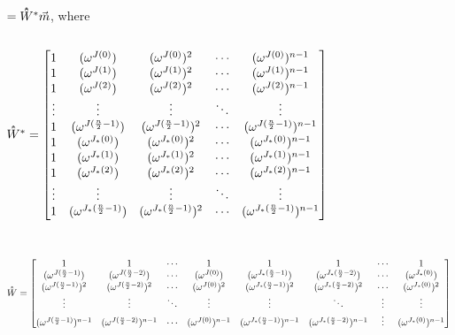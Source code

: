 $ $

$ = \hathat{W}^* \vec{m} $, where 

$ $

\noindent $\hathat{W}^* = \begin{bmatrix}
1 & (\omega^{J(0)}) & (\omega^{J(0)})^2 & \cdots & (\omega^{J(0)})^{n-1}\\
1 & (\omega^{J(1)}) & (\omega^{J(1)})^2 & \cdots & (\omega^{J(1)})^{n-1}\\
1 & (\omega^{J(2)}) & (\omega^{J(2)})^2 & \cdots & (\omega^{J(2)})^{n-1}\\
\vdots & \vdots & \vdots & \ddots & \vdots \\
1 & (\omega^{J(\frac{n}{2}-1)}) & (\omega^{J(\frac{n}{2}-1)})^2 & \cdots & (\omega^{J(\frac{n}{2}-1)})^{n-1}\\
1 & (\omega^{J_*(0)}) & (\omega^{J_*(0)})^2 & \cdots & (\omega^{J_*(0)})^{n-1}\\
1 & (\omega^{J_*(1)}) & (\omega^{J_*(1)})^2 & \cdots & (\omega^{J_*(1)})^{n-1}\\
1 & (\omega^{J_*(2)}) & (\omega^{J_*(2)})^2 & \cdots & (\omega^{J_*(2)})^{n-1}\\
\vdots & \vdots & \vdots & \ddots & \vdots \\
1 & (\omega^{J_*(\frac{n}{2}-1)}) & (\omega^{J_*(\frac{n}{2}-1)})^2 & \cdots & (\omega^{J_*(\frac{n}{2}-1)})^{n-1}\\
\end{bmatrix}$

$ $

$ $

\noindent $\hathat W = \begin{bmatrix}
1 & 1 & \cdots & 1 & 1 & 1 & \cdots & 1\\
(\omega^{J(\frac{n}{2} - 1)}) & (\omega^{J(\frac{n}{2} - 2)}) & \cdots & (\omega^{J(0)}) & (\omega^{J_*(\frac{n}{2} - 1)}) & (\omega^{J_*(\frac{n}{2} - 2)}) & \cdots & (\omega^{J_*(0)})\\
(\omega^{J(\frac{n}{2} - 1)})^2 & (\omega^{J(\frac{n}{2} - 2)})^2 & \cdots & (\omega^{J(0)})^2 & (\omega^{J_*(\frac{n}{2} - 1)})^2 & (\omega^{J_*(\frac{n}{2} - 2)})^2 & \cdots & (\omega^{J_*(0)})^2 \\
\vdots & \vdots & \ddots & \vdots & \vdots & \ddots & \vdots & \vdots \\
(\omega^{J(\frac{n}{2} - 1)})^{n-1} & (\omega^{J(\frac{n}{2} - 2)})^{n-1} & \cdots & (\omega^{J(0)})^{n-1} & (\omega^{J_*(\frac{n}{2} - 1)})^{n-1} & (\omega^{J_*(\frac{n}{2} - 2)})^{n-1} & \vdots  & (\omega^{J_*(0)})^{n-1}
\end{bmatrix}$


